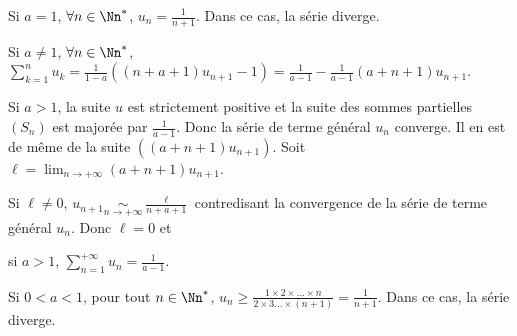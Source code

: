 {{Si $a = 1$, $\forall n\in\Nn^*$, $u_n=\frac{1}{n+1}$. Dans ce cas, la série diverge.

Si $a\neq 1$, $\forall n\in\Nn^*$, $\sum_{k=1}^{n}u_k=\frac{1}{1-a}((n+a+1)u_{n+1} - 1)=\frac{1}{a-1}- \frac{1}{a-1}(a+n+1)u_{n+1}$.

Si $a > 1$, la suite $u$ est strictement positive et la suite des sommes partielles $(S_n)$ est majorée par $\frac{1}{a-1}$. Donc la série de terme général $u_n$ converge. Il en est de même de la suite $((a+n+1)u_{n+1})$. Soit $\ell=\lim_{n \rightarrow +\infty}(a+n+1)u_{n+1}$.

Si $\ell\neq0$, $u_{n+1}\underset{n\rightarrow+\infty}{\sim}\frac{\ell}{n+a+1}$ contredisant la convergence de la série de terme général $u_n$. Donc $\ell= 0$ et

\begin{center}
si $a > 1$,  $\sum_{n=1}^{+\infty}u_n=\frac{1}{a-1}$.
\end{center}

Si $0<a<1$, pour tout $n\in\Nn^*$, $u_n\geqslant\frac{1\times2\times\ldots\times n}{2\times3\ldots\times(n+1)}=\frac{1}{n+1}$. Dans ce cas, la série diverge.
}
}
